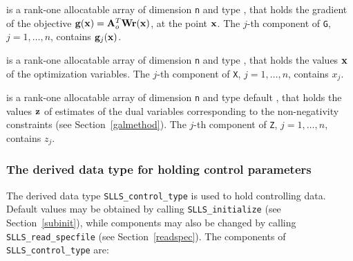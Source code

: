 \documentclass{galahad}
\newcommand{\packagename}{SLLS}
\begin{document}
\begin{description}
 is a rank-one allocatable array of dimension {\tt n} and type
\realdp, that holds the gradient of the objective
 ${\mathbf{g}}({\mathbf{x}}) = {\mathbf{A}}_o^T {\mathbf{W}} {\mathbf{r}}({\mathbf{x}})$, at the point ${\mathbf{x}}$. 
The $j$-th component of {\tt G}, $j = 1, \ldots, n$, contains ${\mathbf{g}}_{j}({\mathbf{x}})$.

 is a rank-one allocatable array of dimension {\tt n} and type
\realdp,
that holds the values ${\mathbf{x}}$ of the optimization variables.
The $j$-th component of {\tt X}, $j = 1,  \ldots , n$, contains $x_{j}$.

 is a rank-one allocatable array of dimension {\tt n} and type default
\realdp, that holds
the values ${\mathbf{z}}$ of estimates  of the dual variables
corresponding to the non-negativity constraints (see Section~\ref{galmethod}).
The $j$-th component of {\tt Z}, $j = 1,  \ldots ,  n$, contains $z_{j}$.

\end{description}


\subsubsection{The derived data type for holding control
 parameters}\label{typecontrol}
The derived data type
{\tt \packagename\_control\_type}
is used to hold controlling data. Default values may be obtained by calling
{\tt \packagename\_initialize}
(see Section~\ref{subinit}),
while components may also be changed by calling
{\tt \packagename\_read\-\_specfile}
(see Section~\ref{readspec}).
The components of
{\tt \packagename\_control\_type}
are:
\end{document}
